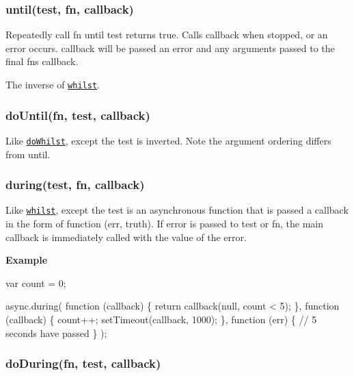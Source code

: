 \label{_until}%
 \subsubsection*{until(test, fn, callback)}

Repeatedly call {\ttfamily fn} until {\ttfamily test} returns {\ttfamily true}. Calls {\ttfamily callback} when stopped, or an error occurs. {\ttfamily callback} will be passed an error and any arguments passed to the final {\ttfamily fn}\textquotesingle{}s callback.

The inverse of \href{#whilst}{\tt {\ttfamily whilst}}. 



\label{_doUntil}%
 \subsubsection*{do\+Until(fn, test, callback)}

Like \href{#doWhilst}{\tt {\ttfamily do\+Whilst}}, except the {\ttfamily test} is inverted. Note the argument ordering differs from {\ttfamily until}. 



\label{_during}%
 \subsubsection*{during(test, fn, callback)}

Like \href{#whilst}{\tt {\ttfamily whilst}}, except the {\ttfamily test} is an asynchronous function that is passed a callback in the form of {\ttfamily function (err, truth)}. If error is passed to {\ttfamily test} or {\ttfamily fn}, the main callback is immediately called with the value of the error.

{\bfseries Example}


\begin{DoxyCode}
var count = 0;

async.during(
    function (callback) \{
      return callback(null, count < 5);
    \},
    function (callback) \{
        count++;
        setTimeout(callback, 1000);
    \},
    function (err) \{
        // 5 seconds have passed
    \}
);
\end{DoxyCode}
 



\label{_doDuring}%
 \subsubsection*{do\+During(fn, test, callback)}


